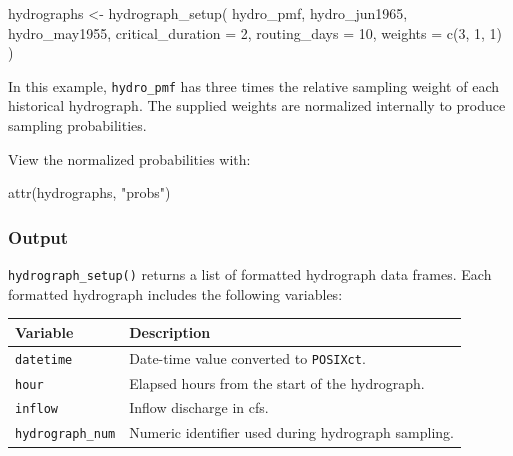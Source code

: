 \documentclass[
  letterpaper,
  DIV=11,
  numbers=noendperiod]{scrreprt}
\newenvironment{Shaded}{\begin{snugshade}}{\end{snugshade}}
\newcommand{\AttributeTok}[1]{\textcolor[rgb]{0.40,0.45,0.13}{#1}}
\newcommand{\DecValTok}[1]{\textcolor[rgb]{0.68,0.00,0.00}{#1}}
\newcommand{\FunctionTok}[1]{\textcolor[rgb]{0.28,0.35,0.67}{#1}}
\newcommand{\NormalTok}[1]{\textcolor[rgb]{0.00,0.23,0.31}{#1}}
\newcommand{\OtherTok}[1]{\textcolor[rgb]{0.00,0.23,0.31}{#1}}
\newcommand{\StringTok}[1]{\textcolor[rgb]{0.13,0.47,0.30}{#1}}
\newcounter{none} %
\begin{document}
\begin{Shaded}
\begin{Highlighting}[]
\NormalTok{hydrographs }\OtherTok{\textless{}{-}} \FunctionTok{hydrograph\_setup}\NormalTok{(}
\NormalTok{  hydro\_pmf,}
\NormalTok{  hydro\_jun1965,}
\NormalTok{  hydro\_may1955,}
  \AttributeTok{critical\_duration =} \DecValTok{2}\NormalTok{,}
  \AttributeTok{routing\_days =} \DecValTok{10}\NormalTok{,}
  \AttributeTok{weights =} \FunctionTok{c}\NormalTok{(}\DecValTok{3}\NormalTok{, }\DecValTok{1}\NormalTok{, }\DecValTok{1}\NormalTok{)}
\NormalTok{)}
\end{Highlighting}
\end{Shaded}

In this example, \texttt{hydro\_pmf} has three times the relative
sampling weight of each historical hydrograph. The supplied weights are
normalized internally to produce sampling probabilities.

View the normalized probabilities with:

\begin{Shaded}
\begin{Highlighting}[]
\FunctionTok{attr}\NormalTok{(hydrographs, }\StringTok{"probs"}\NormalTok{)}
\end{Highlighting}
\end{Shaded}

\subsubsection{Output}\label{output}

\texttt{hydrograph\_setup()} returns a list of formatted hydrograph data
frames. Each formatted hydrograph includes the following variables:

{\def\LTcaptype{none} %
\begin{longtable}[]{@{}
  >{\raggedright\arraybackslash}p{}
  >{\raggedright\arraybackslash}p{}@{}}
\toprule\noalign{}
\begin{minipage}[b]{\linewidth}\raggedright
Variable
\end{minipage} & \begin{minipage}[b]{\linewidth}\raggedright
Description
\end{minipage} \\
\midrule\noalign{}
\endhead
\bottomrule\noalign{}
\endlastfoot
\texttt{datetime} & Date-time value converted to \texttt{POSIXct}. \\
\texttt{hour} & Elapsed hours from the start of the hydrograph. \\
\texttt{inflow} & Inflow discharge in cfs. \\
\texttt{hydrograph\_num} & Numeric identifier used during hydrograph
sampling. \\
\end{longtable}
}
\end{document}
